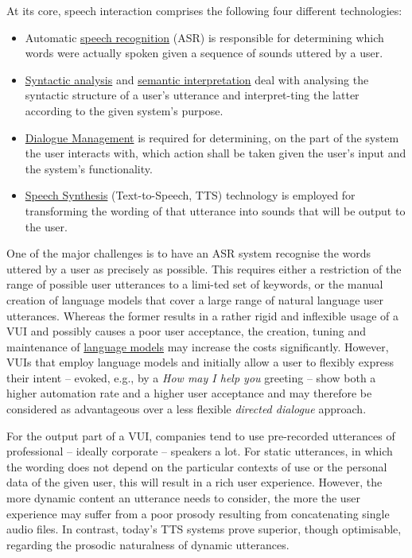 \documentclass[]{../../metanetpaper}
\begin{document}
\begin{multicols}{2}
At its core, speech interaction comprises the following four different technologies:
\begin{itemize}
\item Automatic \underline{speech recognition} (ASR) is responsible for determining which words were actually spoken given a sequence of sounds uttered by a user.
\item \underline{Syntactic analysis} and \underline{semantic interpretation} deal with analysing the syntactic structure of a user’s utterance and interpret-ting the latter according to the given system’s purpose.
\item \underline{Dialogue Management} is required for determining, on the part of the system the user interacts with, which action shall be taken given the user’s input and the system’s functionality.
\item \underline{Speech Synthesis} (Text-to-Speech, TTS) technology is employed for transforming the wording of that utterance into sounds that will be output to the user. 
\end{itemize}
One of the major challenges is to have an ASR system recognise the words uttered by a user as precisely as possible. This requires either a restriction of the range of possible user utterances to a limi-ted set of keywords, or the manual creation of language models that cover a large range of natural language user utterances. Whereas the former results in a rather rigid and inflexible usage of a VUI and possibly causes a poor user acceptance, the creation, tuning and maintenance of \underline{language models} may increase the costs significantly. However, VUIs that employ language models and initially allow a user to flexibly express their intent – evoked, e.g., by a \textit{How may I help you} greeting – show both a higher automation rate and a higher user acceptance and may therefore be considered as advantageous over a less flexible \textit{directed dialogue} approach.

For the output part of a VUI, companies tend to use pre-recorded utterances of professional – ideally corporate – speakers a lot. For static utterances, in which the wording does not depend on the particular contexts of use or the personal data of the given user, this will result in a rich user experience. However, the more dynamic content an utterance needs to consider, the more the user experience may suffer from a poor prosody resulting from concatenating single audio files. In contrast, today’s TTS systems prove superior, though optimisable, regarding the prosodic naturalness of dynamic utterances.  


\end{multicols}
\end{document}
